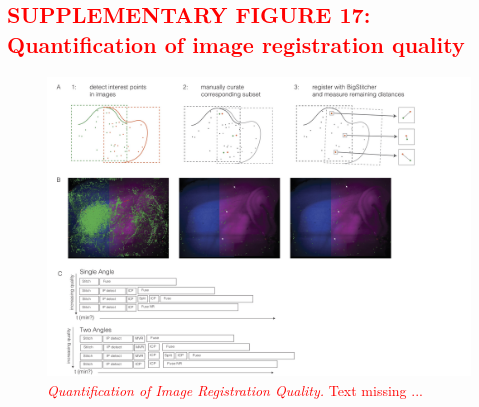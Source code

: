\documentclass[]{spie}  %
\def\red{\textcolor{red}}
\begin{document}
\subsection*{\red{SUPPLEMENTARY FIGURE 17: Quantification of image registration quality}}
\vspace{1mm}
\begin{figure}[h!]
\includegraphics[width=\textwidth]{bigstitcher_registrationquality.jpg}
\vspace{-2.0mm}
\caption{\hspace{-0.5mm} \red{\emph{Quantification of Image Registration Quality.} Text missing ...
}}
\label{fig:sup-fig-registration-quality}
\end{figure}

\pagebreak
\end{document}
